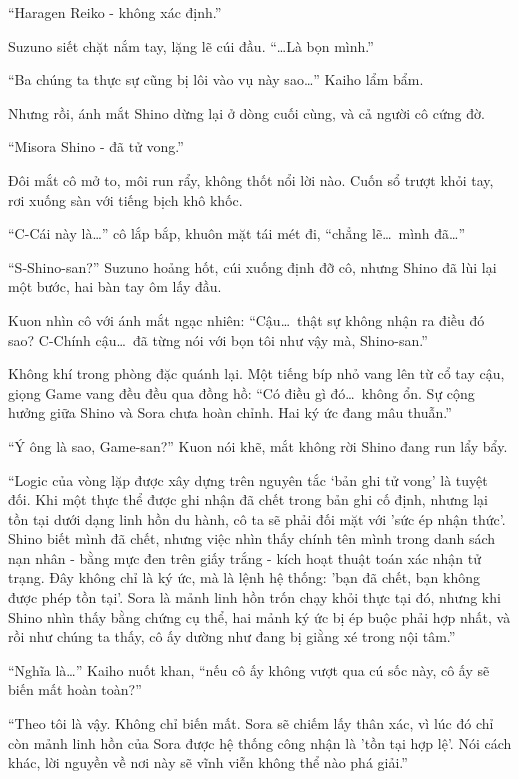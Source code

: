 \documentclass[../main.tex]{subfiles}
\begin{document}
``Haragen Reiko - không xác định.''

Suzuno siết chặt nắm tay, lặng lẽ cúi đầu. ``\dots Là bọn mình.''

``Ba chúng ta thực sự cũng bị lôi vào vụ này sao\dots'' Kaiho lẩm bẩm.

Nhưng rồi, ánh mắt Shino dừng lại ở dòng cuối cùng, và cả người cô cứng đờ.

``Misora Shino - đã tử vong.''

Đôi mắt cô mở to, môi run rẩy, không thốt nổi lời nào. Cuốn sổ trượt khỏi tay, rơi xuống sàn với tiếng bịch khô khốc.

``C-Cái này là\dots'' cô lắp bắp, khuôn mặt tái mét đi, ``chẳng lẽ\dots\ mình đã\dots''

``S-Shino-san?'' Suzuno hoảng hốt, cúi xuống định đỡ cô, nhưng Shino đã lùi lại một bước, hai bàn tay ôm lấy đầu.

Kuon nhìn cô với ánh mắt ngạc nhiên: ``Cậu\dots\ thật sự không nhận ra điều đó sao? C-Chính cậu\dots\ đã từng nói với bọn tôi như vậy mà, Shino-san.''

Không khí trong phòng đặc quánh lại. Một tiếng bíp nhỏ vang lên từ cổ tay cậu, giọng Game vang đều đều qua đồng hồ: ``Có điều gì đó\dots\ không ổn. Sự cộng hưởng giữa Shino và Sora chưa hoàn chỉnh. Hai ký ức đang mâu thuẫn.''

``Ý ông là sao, Game-san?'' Kuon nói khẽ, mắt không rời Shino đang run lẩy bẩy.

``Logic của vòng lặp được xây dựng trên nguyên tắc `bản ghi tử vong' là tuyệt đối. Khi một thực thể được ghi nhận đã chết trong bản ghi cố định, nhưng lại tồn tại dưới dạng linh hồn du hành, cô ta sẽ phải đối mặt với 'sức ép nhận thức'. Shino biết mình đã chết, nhưng việc nhìn thấy chính tên mình trong danh sách nạn nhân - bằng mực đen trên giấy trắng - kích hoạt thuật toán xác nhận tử trạng. Đây không chỉ là ký ức, mà là lệnh hệ thống: 'bạn đã chết, bạn không được phép tồn tại'. Sora là mảnh linh hồn trốn chạy khỏi thực tại đó, nhưng khi Shino nhìn thấy bằng chứng cụ thể, hai mảnh ký ức bị ép buộc phải hợp nhất, và rồi như chúng ta thấy, cô ấy dường như đang bị giằng xé trong nội tâm.''

``Nghĩa là\dots'' Kaiho nuốt khan, ``nếu cô ấy không vượt qua cú sốc này, cô ấy sẽ biến mất hoàn toàn?''

``Theo tôi là vậy. Không chỉ biến mất. Sora sẽ chiếm lấy thân xác, vì lúc đó chỉ còn mảnh linh hồn của Sora được hệ thống công nhận là 'tồn tại hợp lệ'. Nói cách khác, lời nguyền về nơi này sẽ vĩnh viễn không thể nào phá giải.''
\end{document}
